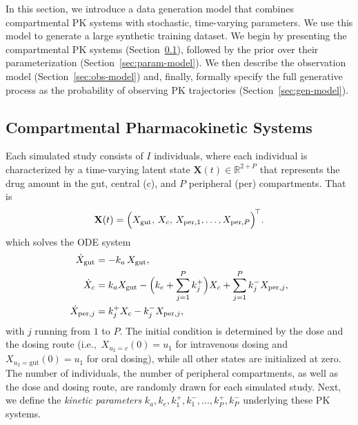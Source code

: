 
In this section, we introduce a data generation model that combines compartmental PK systems with stochastic, time-varying parameters.
%
We use this model to generate a large synthetic training dataset.
%
We begin by presenting the compartmental PK systems (Section~\ref{sec:pk-systems}), followed by the prior over their parameterization (Section~\ref{sec:param-model}).
%
We then describe the observation model (Section~\ref{sec:obs-model}) and, finally, formally specify the full generative process as the probability of observing PK trajectories (Section~\ref{sec:gen-model}).

\subsection{Compartmental Pharmacokinetic Systems}
\label{sec:pk-systems}

Each simulated study consists of $I$ individuals, where each individual is characterized by a time-varying latent state $\mathbf{X}(t) \in \mathbb{R}^{2+P}$ that represents the drug amount in the gut, central (c), and $P$ peripheral (per) compartments. That is
\begin{equation}
    \mathbf{X}(t)= \Bigl(X_{\text{gut}},\,X_{c},\,X_{\text{per},1}, \dots, X_{\text{per},P} \Bigr)^{\!\top}.
\end{equation}
%
%
which solves the ODE system
\begin{align}
\dot X_{\text{gut}}      &= -k_{a}\,X_{\text{gut}}, \nonumber\\
\dot X_{c}               &= k_{a}X_{\text{gut}}
                           -\Bigl(k_{e}+\sum_{j=1}^{P}k^{+}_{j}\Bigr)X_{c}
                           +\sum_{j=1}^{P}k^{-}_{j}X_{\text{per},j}, \nonumber\\
\dot X_{\text{per},j}    &= k^{+}_{j}X_{c}-k^{-}_{j}X_{\text{per},j},                
\label{eq:pk-odes}                           
\end{align}
with $j$ running from $1$ to $P$.
%
The initial condition is determined by the dose and the dosing route (i.e.,~$X_{u_2=c}(0)=u_1$ for intravenous dosing and $X_{u_2=\text{gut}}(0) = u_1$ for oral dosing), while all other states are initialized at zero.
%
The number of individuals, the number of peripheral compartments, as well as the dose and dosing route, are randomly drawn for each simulated study.
%
Next, we define the \textit{kinetic parameters} $k_a, k_e, k^+_1,  k^-_1,..., k^+_P, k^-_P$ underlying these PK systems. 

